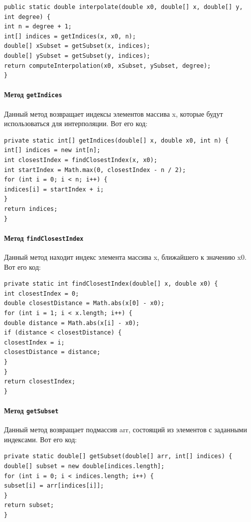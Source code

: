 \documentclass[12pt]{article}
\begin{document}
    \begin{verbatim}
public static double interpolate(double x0, double[] x, double[] y, int degree) {
int n = degree + 1;
int[] indices = getIndices(x, x0, n);
double[] xSubset = getSubset(x, indices);
double[] ySubset = getSubset(y, indices);
return computeInterpolation(x0, xSubset, ySubset, degree);
}
    \end{verbatim}

    \paragraph{Метод \texttt{getIndices}}
    Данный метод возвращает индексы элементов массива x, которые будут использоваться для интерполяции. Вот его код:

    \begin{verbatim}
private static int[] getIndices(double[] x, double x0, int n) {
int[] indices = new int[n];
int closestIndex = findClosestIndex(x, x0);
int startIndex = Math.max(0, closestIndex - n / 2);
for (int i = 0; i < n; i++) {
indices[i] = startIndex + i;
}
return indices;
}
    \end{verbatim}

    \paragraph{Метод \texttt{findClosestIndex}}
    Данный метод находит индекс элемента массива x, ближайшего к значению x0. Вот его код:

    \begin{verbatim}
private static int findClosestIndex(double[] x, double x0) {
int closestIndex = 0;
double closestDistance = Math.abs(x[0] - x0);
for (int i = 1; i < x.length; i++) {
double distance = Math.abs(x[i] - x0);
if (distance < closestDistance) {
closestIndex = i;
closestDistance = distance;
}
}
return closestIndex;
}
    \end{verbatim}

    \paragraph{Метод \texttt{getSubset}}
    Данный метод возвращает подмассив arr, состоящий из элементов с заданными индексами. Вот его код:

    \begin{verbatim}
private static double[] getSubset(double[] arr, int[] indices) {
double[] subset = new double[indices.length];
for (int i = 0; i < indices.length; i++) {
subset[i] = arr[indices[i]];
}
return subset;
}
    \end{verbatim}
\end{document}
